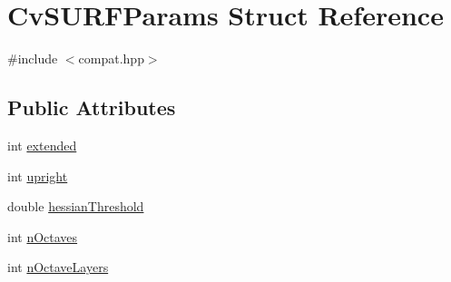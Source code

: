 \hypertarget{structCvSURFParams}{\section{Cv\-S\-U\-R\-F\-Params Struct Reference}
\label{structCvSURFParams}
}


{\ttfamily \#include $<$compat.\-hpp$>$}

\subsection*{Public Attributes}
\begin{DoxyCompactItemize}
\item 
int \hyperlink{structCvSURFParams_ae5ee86578ccbc8a56ad0174735404479}{extended}
\item 
int \hyperlink{structCvSURFParams_a0cbaaf84ed071756eb0c1354bf05ed79}{upright}
\item 
double \hyperlink{structCvSURFParams_a57e3919e8bda581f2c7f8d2120056c40}{hessian\-Threshold}
\item 
int \hyperlink{structCvSURFParams_a5d5f0670389c197ece9b188775600ce6}{n\-Octaves}
\item 
int \hyperlink{structCvSURFParams_a6be1eb644274f0ba5fd650e656dc2524}{n\-Octave\-Layers}
\end{DoxyCompactItemize}


